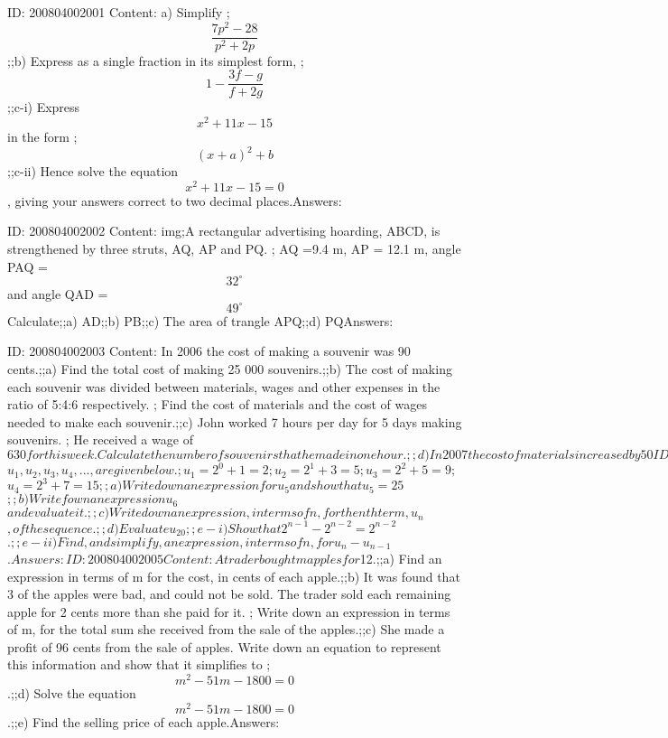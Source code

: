 \documentclass{article}
\begin{document}
ID: 200804002001
Content:
a) Simplify ; $$\frac{7p^2 - 28}{p^2 + 2p}$$;;b) Express as a single fraction in its simplest form, ; $$1 - \frac{3f - g}{f + 2g}$$;;c-i) Express $$x^2 + 11x - 15$$ in the form ; $$(x + a)^2 + b$$;;c-ii) Hence solve the equation $$x^2 + 11x - 15 = 0$$, giving your answers correct to two decimal places.Answers:

ID: 200804002002
Content:
img;A rectangular advertising hoarding, ABCD, is strengthened by three struts, AQ, AP and PQ. ; AQ =9.4 m, AP = 12.1 m, angle PAQ = $$32^{\circ}$$ and angle QAD = $$49^{\circ}$$ Calculate;;a) AD;;b) PB;;c) The area of trangle APQ;;d) PQAnswers:

ID: 200804002003
Content:
In 2006 the cost of making a souvenir was 90 cents.;;a) Find the total cost of making 25 000 souvenirs.;;b) The cost of making each souvenir was divided between materials, wages and other expenses in the ratio of 5:4:6 respectively. ; Find the cost of materials and the cost of wages needed to make each souvenir.;;c) John worked 7 hours per day for 5 days making souvenirs. ; He received a wage of $630 for this week. Calculate the number of souvenirs that he made in one hour.;;d) In 2007 the cost of materials increased by 50%

ID: 200804002004
Content:
The first four terms in a sequence of numbers, $$u_1$$, $$u_2$$, $$u_3$$,$$u_4$$, ..., are given below. ; $$u_1 = 2^0 + 1 = 2$$ ; $$u_2 = 2^1 + 3 = 5$$ ; $$u_3 = 2^2 + 5 = 9$$ ; $$u_4 = 2^3 + 7 = 15$$;;a) Write down an expression for $$u_5$$ and show that $$u_5 = 25$$;;b) Write fown an expression $$u_6$$ and evaluate it.;;c) Write down an expression, in terms of n, for the nth term, $$u_n$$, of the sequence.;;d) Evaluate $$u_{20}$$;;e-i) Show that $$2^{n-1} - 2^{n-2} = 2^{n-2}$$.;;e-ii) Find, and simplify, an expression, in terms of n, for $$u_n - u_{n-1}$$.Answers:

ID: 200804002005
Content:
A trader bought m apples for $12.;;a) Find an expression in terms of m for the cost, in cents of each apple.;;b) It was found that 3 of the apples were bad, and could not be sold. The trader sold each remaining apple for 2 cents more than she paid for it. ; Write down an expression in terms of m, for the total sum she received from the sale of the apples.;;c) She made a profit of 96 cents from the sale of apples. Write down an equation to represent this information and show that it simplifies to ; $$m^2 - 51m - 1800 = 0$$.;;d) Solve the equation $$m^2 - 51m - 1800 = 0$$.;;e) Find the selling price of each apple.Answers:
\end{document}

